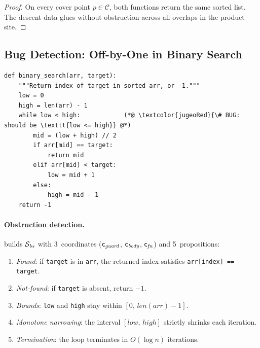 \begin{proof}
On every cover point $p \in \mathcal{C}$, both functions return the
same sorted list.  The descent data glues without obstruction across
all overlaps in the product site.
\end{proof}


\subsection{Bug Detection: Off-by-One in Binary Search}%
\label{sec:app-bug}

\begin{lstlisting}[style=jugeo-python,caption={Buggy binary search (off-by-one at line~7).},label={lst:binsearch-bug}]
def binary_search(arr, target):
    """Return index of target in sorted arr, or -1."""
    low = 0
    high = len(arr) - 1
    while low < high:            (*@ \textcolor{jugeoRed}{\# BUG: should be \texttt{low <= high}} @*)
        mid = (low + high) // 2
        if arr[mid] == target:
            return mid
        elif arr[mid] < target:
            low = mid + 1
        else:
            high = mid - 1
    return -1
\end{lstlisting}

\paragraph{Obstruction detection.}
\JuGeo{} builds $\mathcal{S}_{\mathit{bs}}$ with 3~coordinates
($\mathsf{c}_{\mathit{guard}}$, $\mathsf{c}_{\mathit{body}}$,
$\mathsf{c}_{\mathit{fn}}$) and 5~propositions:
\begin{enumerate}[nosep,label=(\roman*)]
  \item \emph{Found}: if \texttt{target} is in \texttt{arr}, the
    returned index satisfies \texttt{arr[index] == target}.
  \item \emph{Not-found}: if \texttt{target} is absent, return $-1$.
  \item \emph{Bounds}: \texttt{low} and \texttt{high} stay within
    $[0,\, \mathit{len}(\mathit{arr})-1]$.
  \item \emph{Monotone narrowing}: the interval $[\mathit{low},\,
    \mathit{high}]$ strictly shrinks each iteration.
  \item \emph{Termination}: the loop terminates in
    $O(\log n)$ iterations.
\end{enumerate}

